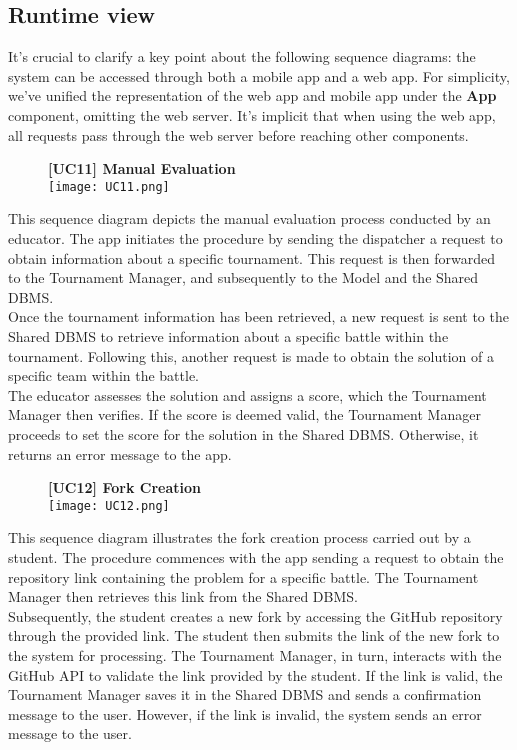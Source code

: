 \documentclass{article}
\begin{document}
\subsection{Runtime view}
It's crucial to clarify a key point about the following sequence diagrams: the system can be accessed through both a mobile app and a web app. For simplicity, we've unified the representation of the web app and mobile app under the \textbf{App} component, omitting the web server. It's implicit that when using the web app, all requests pass through the web server before reaching other components.

\begin{figure}[H]
    \centering
    \textbf{[UC11] Manual Evaluation} \\
    \texttt{[image: UC11.png]}
\end{figure}
\noindent
This sequence diagram depicts the manual evaluation process conducted by an educator. The app initiates the procedure by sending the dispatcher a request to obtain information about a specific tournament. This request is then forwarded to the Tournament Manager, and subsequently to the Model and the Shared DBMS. \\
Once the tournament information has been retrieved, a new request is sent to the Shared DBMS to retrieve information about a specific battle within the tournament. Following this, another request is made to obtain the solution of a specific team within the battle. \\
The educator assesses the solution and assigns a score, which the Tournament Manager then verifies. If the score is deemed valid, the Tournament Manager proceeds to set the score for the solution in the Shared DBMS. Otherwise, it returns an error message to the app. \\


\begin{figure}[H]
    \centering
    \textbf{[UC12] Fork Creation} \\
    \texttt{[image: UC12.png]}
\end{figure}
\noindent
This sequence diagram illustrates the fork creation process carried out by a student. The procedure commences with the app sending a request to obtain the repository link containing the problem for a specific battle. The Tournament Manager then retrieves this link from the Shared DBMS. \\
Subsequently, the student creates a new fork by accessing the GitHub repository through the provided link. The student then submits the link of the new fork to the system for processing. The Tournament Manager, in turn, interacts with the GitHub API to validate the link provided by the student. If the link is valid, the Tournament Manager saves it in the Shared DBMS and sends a confirmation message to the user. However, if the link is invalid, the system sends an error message to the user.
\end{document}
